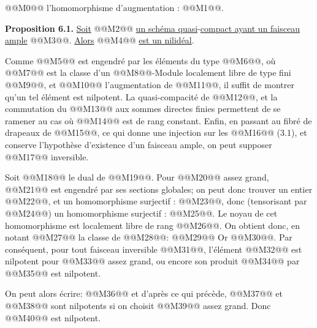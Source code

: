 
@@M0@@ l'homomorphisme d'augmentation : @@M1@@.

\textbf{Proposition 6.1.} \uline{Soit} @@M2@@ \uline{un schéma quasi}-\uline{compact ayant un faisceau ample} @@M3@@. \uline{Alors} @@M4@@ \uline{est un nilidéal}.

Comme @@M5@@ est engendré par les éléments du type @@M6@@, où @@M7@@ est la classe d'un @@M8@@-Module localement libre de type fini @@M9@@, et @@M10@@ l'augmentation de @@M11@@, il suffit de montrer qu'un tel élément est nilpotent. La quasi-compacité de @@M12@@, et la commutation du @@M13@@ aux sommes directes finies permettent de se ramener au cas où @@M14@@ est de rang constant. Enfin, en passant au fibré de drapeaux de @@M15@@, ce qui donne une injection sur les @@M16@@ (3.1), et conserve l'hypothèse d'existence d'un faisceau ample, on peut supposer @@M17@@ inversible.

Soit @@M18@@ le dual de @@M19@@. Pour @@M20@@ assez grand, @@M21@@ est engendré par ses sections globales; on peut donc trouver un entier @@M22@@, et un homomorphisme surjectif : @@M23@@, donc (tensorisant par @@M24@@) un homomorphisme surjectif : @@M25@@. Le noyau de cet homomorphisme est localement libre de rang @@M26@@. On obtient donc, en notant @@M27@@ la classe de @@M28@@:
@@M29@@
Or @@M30@@. Par conséquent, pour tout faisceau inversible @@M31@@, l'élément @@M32@@ est nilpotent pour @@M33@@ assez grand, ou encore son produit @@M34@@ par @@M35@@ est nilpotent.

On peut alors écrire:
@@M36@@
et d'après ce qui précède, @@M37@@ et @@M38@@ sont nilpotents si on choisit @@M39@@ assez grand. Donc @@M40@@ est nilpotent.


